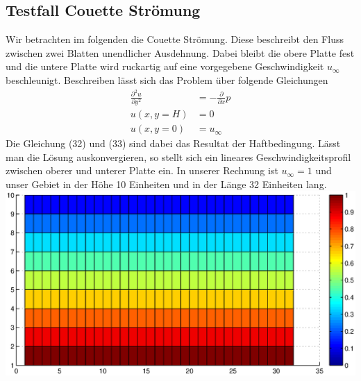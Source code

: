 \documentclass{article}
\newcommand{\ddx}{\frac{\partial }{\partial x}}
\begin{document}
\subsection{Testfall Couette Strömung}
Wir betrachten im folgenden die Couette Strömung. Diese beschreibt den Fluss zwischen zwei Blatten unendlicher Ausdehnung.
Dabei bleibt die obere Platte fest und die untere Platte wird ruckartig auf eine vorgegebene Geschwindigkeit $u_{\infty}$ beschleunigt.
Beschreiben lässt sich das Problem über folgende Gleichungen
\begin{align}
\frac{ \partial^2 u}{\partial y^2} &= -\ddx p \\
u(x,y=H) &= 0 \\
u(x,y=0) &= u_{\infty}
\end{align}
Die Gleichung (32) und (33) sind dabei das Resultat der Haftbedingung.\newpage
Lässt man die Lösung auskonvergieren, so stellt sich ein lineares Geschwindigkeitsprofil zwischen oberer und unterer Platte ein.
In unserer Rechnung ist $u_{\infty}=1$ und unser Gebiet in der Höhe 10 Einheiten und in der Länge 32 Einheiten lang.\\
\includegraphics[scale=0.6]{test/6cou/couette.eps}
\end{document}
